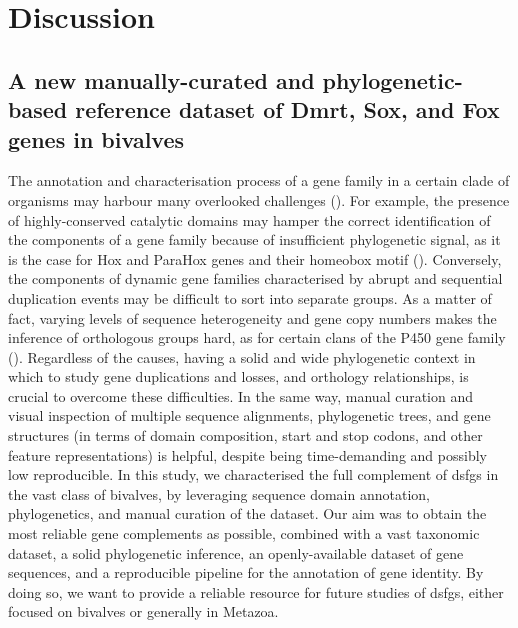 \section{Discussion} \label{chpater3-discussion}
\subsection{A new manually-curated and phylogenetic-based reference dataset of Dmrt, Sox, and Fox genes in bivalves}
The annotation and characterisation process of a gene family in a certain clade of organisms may harbour many overlooked challenges (). For example, the presence of highly-conserved catalytic domains may hamper the correct identification of the components of a gene family because of insufficient phylogenetic signal, as it is the case for Hox and ParaHox genes and their homeobox motif (). Conversely, the components of dynamic gene families characterised by abrupt and sequential duplication events may be difficult to sort into separate groups. As a matter of fact, varying levels of sequence heterogeneity and gene copy numbers makes the inference of orthologous groups hard, as for certain clans of the P450 gene family (). Regardless of the causes, having a solid and wide phylogenetic context in which to study gene duplications and losses, and orthology relationships, is crucial to overcome these difficulties. In the same way, manual curation and visual inspection of multiple sequence alignments, phylogenetic trees, and gene structures (in terms of domain composition, start and stop codons, and other feature representations) is helpful, despite being time-demanding and possibly low reproducible. In this study, we characterised the full complement of \glspl{dsfg} in the vast class of bivalves, by leveraging sequence domain annotation, phylogenetics, and manual curation of the dataset. Our aim was to obtain the most reliable gene complements as possible, combined with a vast taxonomic dataset, a solid phylogenetic inference, an openly-available dataset of gene sequences, and a reproducible pipeline for the annotation of gene identity. By doing so, we want to provide a reliable resource for future studies of \glspl{dsfg}, either focused on bivalves or generally in Metazoa.


